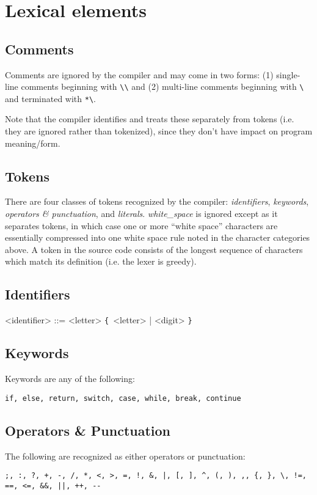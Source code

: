 \documentclass{article}
\def\lrep{\synshortsoff\texttt{\{}\synshorts~}
\def\rrep{\synshortsoff\texttt{\}}\synshorts~}
\begin{document}
\section*{Lexical elements}
\subsection*{Comments}
Comments are ignored by the compiler and may come in two forms: (1)
single-line comments beginning with
\texttt{\textbackslash\textbackslash} and (2) multi-line comments
beginning with \texttt{\textbackslash*} and terminated with
\texttt{*\textbackslash}.

Note that the compiler identifies and treats these separately from
tokens (i.e. they are ignored rather than tokenized), since they don't
have impact on program meaning/form.

\subsection*{Tokens}
There are four classes of tokens recognized by the compiler:
\emph{identifiers}, \emph{keywords}, \emph{operators \& punctuation},
and \emph{literals}. \emph{white\_space} is ignored except as it
separates tokens, in which case one or more ``white space'' characters
are essentially compressed into one white space rule noted in the
character categories above. A token in the source code consists of the
longest sequence of characters which match its definition (i.e. the
lexer is greedy).

\subsection*{Identifiers}
\begin{grammar}
  <identifier> ::= <letter> \lrep <letter> | <digit> \rrep
\end{grammar}

\subsection*{Keywords}
Keywords are any of the following:
\begin{verbatim}
if, else, return, switch, case, while, break, continue
\end{verbatim}

\subsection*{Operators \& Punctuation}
The following are recognized as either operators or punctuation:
\begin{verbatim}
;, :, ?, +, -, /, *, <, >, =, !, &, |, [, ], ^, (, ), ,, {, }, \, !=, ==, <=, &&, ||, ++, --
\end{verbatim}
\end{document}
